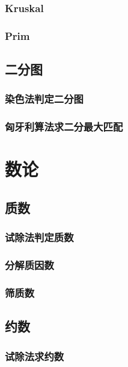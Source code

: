 \documentclass[10pt,a4paper]{article}
\begin{document}
\subsubsection{Kruskal}

\subsubsection{Prim}

\subsection{二分图}
\subsubsection{染色法判定二分图}

\subsubsection{匈牙利算法求二分最大匹配}

\section{数论}
\subsection{质数}
\subsubsection{试除法判定质数}

\subsubsection{分解质因数}

\subsubsection{筛质数}

\subsection{约数}
\subsubsection{试除法求约数}

\end{document}
